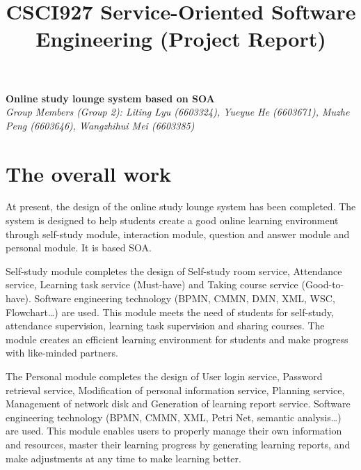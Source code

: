 \documentclass[runningheads]{llncs}
\begin{document}
\title{\large{CSCI927 Service-Oriented Software Engineering (Project Report)}}
\author{}
\institute{}
\maketitle
\vspace{-1cm}



\begin{center}
\Large{\textbf{Online study lounge system based on SOA}} \\ %
\vspace{0.2cm}
\large{\emph{ Group Members (Group 2): Liting Lyu (6603324), Yueyue  He (6603671), Muzhe Peng (6603646), Wangzhihui Mei (6603385)}}\\%
\vspace{0.3cm}
\end{center}

\noindent 
\section{The overall work}
At present, the design of the online study lounge system has been completed. The system is designed to help students create a good online learning environment through self-study module, interaction module, question and answer module and personal module. It is based SOA.


Self-study module completes the design of Self-study room service, Attendance service, Learning task service (Must-have) and Taking course service (Good-to-have). Software engineering technology (BPMN, CMMN, DMN, XML, WSC, Flowchart…) are used. This module meets the need of students for self-study, attendance supervision, learning task supervision and sharing courses. The module creates an efficient learning environment for students and make progress with like-minded partners.


The Personal module completes the design of User login service, Password retrieval service, Modification of personal information service, Planning service, Management of network disk and Generation of learning report service. Software engineering technology (BPMN, CMMN, XML, Petri Net, semantic analysis…) are used. This module enables users to properly manage their own information and resources, master their learning progress by generating learning reports, and make adjustments at any time to make learning better.
\end{document}

